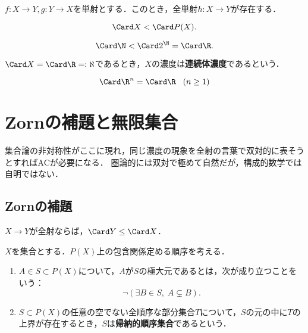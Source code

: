 \documentclass[uplatex,dvipdfmx]{jsreport}
\begin{document}
\begin{proposition}
    $f:X\to Y,g:Y\to X$を単射とする．このとき，全単射$h:X\to Y$が存在する．
\end{proposition}

\begin{proposition}[Cantor]
    \[\Card X<\Card P(X).\]
\end{proposition}

\begin{corollary}
    \[ \Card\N<\Card 2^\N=\Card\R. \]
\end{corollary}

\begin{definition}
    $\Card X=\Card\R=:\aleph$であるとき，$X$の濃度は\textbf{連続体濃度}であるという．
\end{definition}

\begin{proposition}
    \[\Card\R^n=\Card\R\;\;\;(n\ge 1)\]
\end{proposition}

\section{Zornの補題と無限集合}

\begin{tcolorbox}[colframe=ForestGreen, colback=ForestGreen!10!white, breakable ,colbacktitle=ForestGreen!40!white, coltitle=black,fonttitle=\bfseries\sffamily
    ,title=Zornの補題]
    集合論の非対称性がここに現れ，同じ濃度の現象を全射の言葉で双対的に表そうとすればACが必要になる．
    圏論的には双対で極めて自然だが，構成的数学では自明ではない．
\end{tcolorbox}

\subsection{Zornの補題}

\begin{proposition}[AC]
    $X\to Y$が全射ならば，$\Card Y\le\Card X$．
\end{proposition}

\begin{definition}
    $X$を集合とする．$P(X)$上の包含関係定める順序を考える．
    \begin{enumerate}
        \item $A\in S\subset P(X)$について，$A$が$S$の極大元であるとは，次が成り立つことをいう：
        \[ \lnot(\exists B\in S,\;A\subsetneq B). \]
        \item $S\subset P(X)$の任意の空でない全順序な部分集合$T$について，$S$の元の中に$T$の上界が存在するとき，$S$は\textbf{帰納的順序集合}であるという．
    \end{enumerate}
\end{definition}
\end{document}
